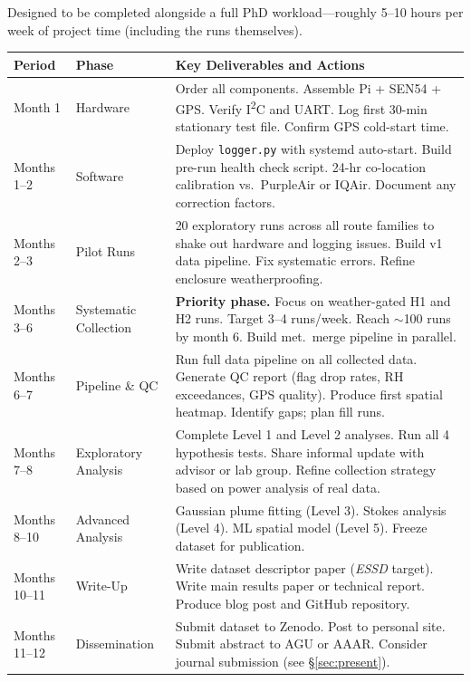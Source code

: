 \documentclass[11pt, letterpaper]{article}
\begin{document}
Designed to be completed alongside a full PhD workload---roughly 5--10 hours per week of
project time (including the runs themselves).

\medskip
\begin{center}
\begin{tabular}{L{2.0cm} L{2.4cm} L{9.0cm}}
\toprule
{}
\color{white}\textbf{Period} &
\color{white}\textbf{Phase} &
\color{white}\textbf{Key Deliverables and Actions} \\
\midrule
Month 1 &
Hardware &
Order all components. Assemble Pi + SEN54 + GPS. Verify I\textsuperscript{2}C and UART. Log first 30-min stationary test file. Confirm GPS cold-start time. \\
Months 1--2 &
Software &
Deploy \texttt{logger.py} with systemd auto-start. Build pre-run health check script. 24-hr co-location calibration vs.\ PurpleAir or IQAir. Document any correction factors. \\
Months 2--3 &
Pilot Runs &
20 exploratory runs across all route families to shake out hardware and logging issues. Build v1 data pipeline. Fix systematic errors. Refine enclosure weatherproofing. \\
Months 3--6 &
Systematic Collection &
\textbf{Priority phase.} Focus on weather-gated H1 and H2 runs. Target 3--4 runs/week. Reach $\sim$100 runs by month 6. Build met.\ merge pipeline in parallel. \\
Months 6--7 &
Pipeline \& QC &
Run full data pipeline on all collected data. Generate QC report (flag drop rates, RH exceedances, GPS quality). Produce first spatial heatmap. Identify gaps; plan fill runs. \\
Months 7--8 &
Exploratory Analysis &
Complete Level 1 and Level 2 analyses. Run all 4 hypothesis tests. Share informal update with advisor or lab group. Refine collection strategy based on power analysis of real data. \\
Months 8--10 &
Advanced Analysis &
Gaussian plume fitting (Level 3). Stokes analysis (Level 4). ML spatial model (Level 5). Freeze dataset for publication. \\
Months 10--11 &
Write-Up &
Write dataset descriptor paper (\textit{ESSD} target). Write main results paper or technical report. Produce blog post and GitHub repository. \\
Months 11--12 &
Dissemination &
Submit dataset to Zenodo. Post to personal site. Submit abstract to AGU or AAAR. Consider journal submission (see \S\ref{sec:present}). \\
\bottomrule
\end{tabular}
\end{center}
\end{document}
